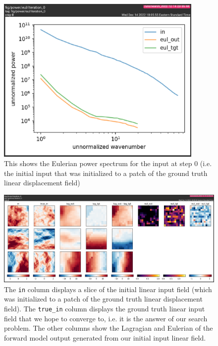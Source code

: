 \documentclass{article}
\begin{document}
\begin{figure}[h]
    \centering
    \includegraphics[width=10cm]{figs/initial-eul-pow-spec.png}
    \caption{This shows the Eulerian power spectrum for the input at step 0 (i.e. the initial input that was initialized to a patch of the ground truth linear displacement field)}
    \label{fig:init-lag-pow}
\end{figure}

\begin{figure}[h]
    \centering
    \includegraphics[width=16cm]{figs/initial-displacements.png}
    \caption{The \texttt{in} column displays a slice of the initial linear input field (which was initialized to a patch of the ground truth linear displacement field). The \texttt{true\_in} column displays the ground truth linear input field that we hope to converge to, i.e. it is the answer of our search problem. The other columns show the Lagragian and Eulerian of the forward model output generated from our initial input linear field.}
    \label{fig:init-slices}
\end{figure}
\end{document}
